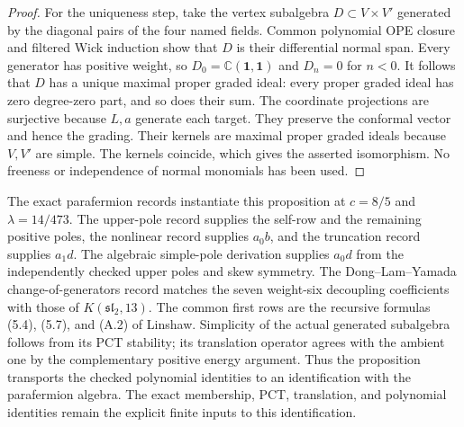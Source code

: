 \begin{proof}
For the uniqueness step, take the vertex subalgebra $D\subset V\times V'$
generated by the diagonal pairs of the four named fields. Common
polynomial OPE closure and filtered Wick induction show that $D$ is
their differential normal span. Every generator has positive weight,
so $D_0=\mathbb C(\mathbf1,\mathbf1)$ and $D_n=0$ for $n<0$.
It follows that $D$ has a unique maximal proper graded ideal: every
proper graded ideal has zero degree-zero part, and so does their sum.
The coordinate projections are surjective because $L,a$ generate
each target. They preserve the conformal vector and hence the grading.
Their kernels are maximal proper graded ideals because $V,V'$ are
simple. The kernels coincide, which gives the asserted isomorphism.
No freeness or independence of normal monomials has been used.
\end{proof}

The exact parafermion records instantiate this proposition at
$c=8/5$ and $\lambda=14/473$. The upper-pole record supplies the
self-row and the remaining positive poles, the nonlinear record
supplies $a_0b$, and the truncation record supplies $a_1d$.
The algebraic simple-pole derivation supplies $a_0d$ from the
independently checked upper poles and skew symmetry. The
Dong--Lam--Yamada change-of-generators record matches the seven
weight-six decoupling coefficients with those of
$K(\mathfrak{sl}_2,13)$. The common first rows are the recursive
formulas (5.4), (5.7), and (A.2) of Linshaw. Simplicity of the actual
generated subalgebra follows from its PCT stability; its translation
operator agrees with the ambient one by the complementary positive
energy argument. Thus the proposition transports the checked
polynomial identities to an identification with the parafermion
algebra. The exact membership, PCT, translation, and polynomial
identities remain the explicit finite inputs to this identification.
